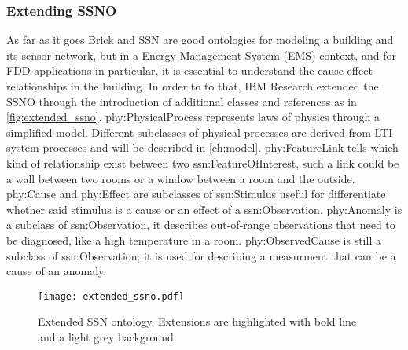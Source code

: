 \subsubsection{Extending SSNO} \label{ssubsec:extended_ssno}
As far as it goes Brick and SSN are good ontologies for modeling a building and its sensor network, but in a Energy Management System (EMS) context, and for FDD applications in particular, it is essential to understand the cause-effect relationships in the building. In order to to that, IBM Research extended the SSNO through the introduction of additional classes and references as in \autoref{fig:extended_ssno}. phy:PhysicalProcess represents laws of physics through a simplified model. Different subclasses of physical processes are derived from LTI system processes and will be described in \autoref{ch:model}.
phy:FeatureLink tells which kind of relationship exist between two ssn:FeatureOfInterest, such a link could be a wall between two rooms or a window between a room and the outside. phy:Cause and phy:Effect are subclasses of ssn:Stimulus useful for differentiate whether said stimulus is a cause or an effect of a ssn:Observation. phy:Anomaly is a subclass of ssn:Observation, it describes out-of-range observations that need to be diagnosed, like a high temperature in a room. phy:ObservedCause is still a subclass of ssn:Observation; it is used for describing a measurment that can be a cause of an anomaly.

\begin{figure}
  \texttt{[image: extended\_ssno.pdf]}
  \caption{Extended SSN ontology. Extensions are highlighted with bold line and a light grey background.}
  \label{fig:extended_ssno}
\end{figure}

